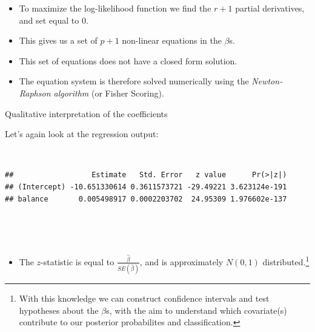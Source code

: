 \documentclass[
  10pt,
  ignorenonframetext,
]{beamer}
\newenvironment{Shaded}{\begin{snugshade}}{\end{snugshade}}
\newcommand{\FunctionTok}[1]{\textcolor[rgb]{0.13,0.29,0.53}{\textbf{#1}}}
\newcommand{\NormalTok}[1]{#1}
\newcommand{\SpecialCharTok}[1]{\textcolor[rgb]{0.81,0.36,0.00}{\textbf{#1}}}
\providecommand{\tightlist}{%
  \setlength{\itemsep}{0pt}\setlength{\parskip}{0pt}}
\begin{document}
\begin{frame}
\begin{itemize}
\item
  To maximize the log-likelihood function we find the \(r+1\) partial
  derivatives, and set equal to 0.
\item
  This gives us a set of \(p+1\) non-linear equations in the \(\beta\)s.
\item
  This set of equations does not have a closed form solution.
\item
  The equation system is therefore solved numerically using the
  \emph{Newton-Raphson algorithm} (or Fisher Scoring).
\end{itemize}
\end{frame}

\begin{frame}[fragile]
\begin{block}{Qualitative interpretation of the coefficients}
\protect\hypertarget{qualitative-interpretation-of-the-coefficients}{}
\(~\)

Let's again look at the regression output:

\(~\)

\scriptsize

\begin{Shaded}
\end{Shaded}

\begin{verbatim}
##                  Estimate   Std. Error   z value      Pr(>|z|)
## (Intercept) -10.651330614 0.3611573721 -29.49221 3.623124e-191
## balance       0.005498917 0.0002203702  24.95309 1.976602e-137
\end{verbatim}

\(~\)

\(~\)

\normalsize

\begin{itemize}
\tightlist
\item
  The \(z\)-statistic is equal to \(\frac{\hat\beta}{SE(\hat\beta)}\),
  and is approximately \(N(0,1)\)
  distributed.\footnote{With this knowledge we can construct confidence intervals and test hypotheses about the $\beta$s, with the aim to understand which covariate(s) contribute to our posterior probabilites and classification.}
\end{itemize}


\end{block}
\end{frame}
\end{document}
